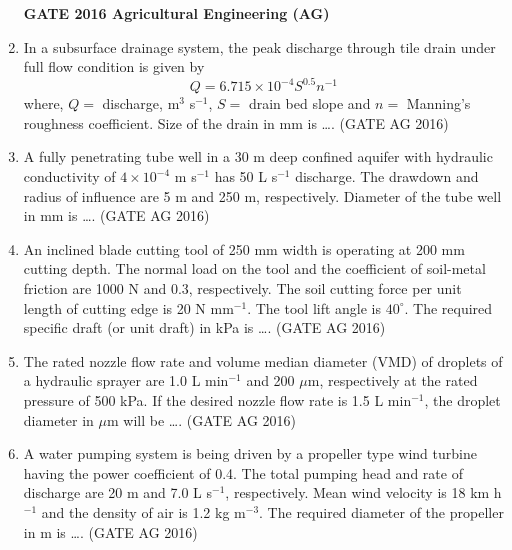 \documentclass[journal]{IEEEtran}
\begin{document}
\begin{enumerate}
\medskip


\noindent
\textbf{GATE 2016 Agricultural Engineering (AG)}

\item 
In a subsurface drainage system, the peak discharge through tile drain under full flow condition is given by
\[
Q = 6.715 \times 10^{-4} S^{0.5} n^{-1}
\]
where, $Q =$ discharge, m$^3$ s$^{-1}$, $S =$ drain bed slope and $n =$ Manning's roughness coefficient. Size of the drain in mm is \dots.
\hfill(GATE AG 2016)\\

\medskip

\item 
A fully penetrating tube well in a 30 m deep confined aquifer with hydraulic conductivity of $4\times 10^{-4}$ m s$^{-1}$ has 50 L s$^{-1}$ discharge. The drawdown and radius of influence are 5 m and 250 m, respectively. Diameter of the tube well in mm is \dots.
\hfill(GATE AG 2016)\\

\medskip

\item 
An inclined blade cutting tool of 250 mm width is operating at 200 mm cutting depth. The normal load on the tool and the coefficient of soil-metal friction are 1000 N and 0.3, respectively. The soil cutting force per unit length of cutting edge is 20 N mm$^{-1}$. The tool lift angle is $40^\circ$. The required specific draft (or unit draft) in kPa is \dots.
\hfill(GATE AG 2016)\\

\medskip

\item 
The rated nozzle flow rate and volume median diameter (VMD) of droplets of a hydraulic sprayer are 1.0 L min$^{-1}$ and 200 $\mu$m, respectively at the rated pressure of 500 kPa. If the desired nozzle flow rate is 1.5 L min$^{-1}$, the droplet diameter in $\mu$m will be \dots.
\hfill(GATE AG 2016)\\

\medskip

\item 
A water pumping system is being driven by a propeller type wind turbine having the power coefficient of 0.4. The total pumping head and rate of discharge are 20 m and 7.0 L s$^{-1}$, respectively. Mean wind velocity is 18 km h$^{-1}$ and the density of air is 1.2 kg m$^{-3}$. The required diameter of the propeller in m is \dots.
\hfill(GATE AG 2016)\\


\end{enumerate}
\end{document}
